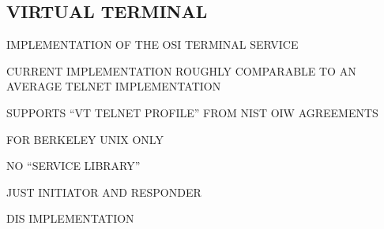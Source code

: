 \begin{bwslide}
\part	{VIRTUAL TERMINAL}\bf

\begin{nrtc}
\item	IMPLEMENTATION OF THE OSI TERMINAL SERVICE

\item	CURRENT IMPLEMENTATION ROUGHLY COMPARABLE TO AN AVERAGE
	TELNET IMPLEMENTATION

\item	SUPPORTS ``VT TELNET PROFILE'' FROM NIST OIW AGREEMENTS
\end{nrtc}
\end{bwslide}


\begin{bwslide}

\begin{nrtc}
\item	FOR BERKELEY UNIX ONLY

\item	NO ``SERVICE LIBRARY''
    \begin{nrtc}
    \item	JUST INITIATOR AND RESPONDER
    \end{nrtc}

\item	DIS IMPLEMENTATION
\end{nrtc}
\end{bwslide}
